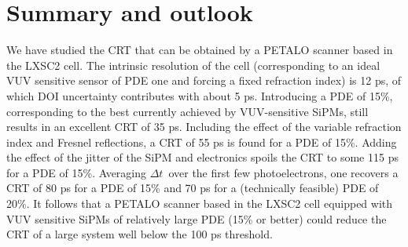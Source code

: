 \documentclass[review]{elsarticle}
\begin{document}
%  
%


\section{Summary and outlook}\label{sec.conclu}

We have studied the CRT that can be obtained by a PETALO scanner based in the LXSC2 cell. The intrinsic resolution of the cell (corresponding to an ideal VUV sensitive sensor of PDE one and forcing a fixed refraction index) is 12 ps, of which DOI uncertainty contributes with about 5 ps. Introducing a PDE of 15\%, corresponding to the best currently achieved by VUV-sensitive SiPMs, still results in an excellent CRT of  35 ps. Including the effect of the variable refraction index and Fresnel reflections, a CRT of 55 ps is found for a PDE of 15\%. Adding the effect of the jitter of the SiPM and electronics spoils the CRT to some 115 ps for a PDE of 15\%. Averaging $\Delta t$~over the first few photoelectrons, one recovers a CRT of 80 ps for a PDE of 15\% and 70 ps for a (technically feasible) PDE of 20\%. It follows that a PETALO scanner based in the LXSC2 cell equipped with VUV sensitive SiPMs of relatively large PDE (15\% or better) could reduce the CRT of a large system well below the 100 ps threshold. 
\end{document}
